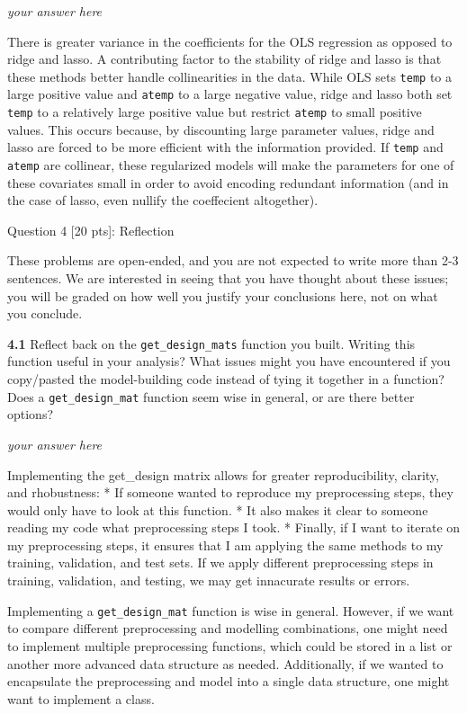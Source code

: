 \documentclass[11pt]{article}
\begin{document}
    \emph{your answer here}

There is greater variance in the coefficients for the OLS regression as
opposed to ridge and lasso. A contributing factor to the stability of
ridge and lasso is that these methods better handle collinearities in
the data. While OLS sets \texttt{temp} to a large positive value and
\texttt{atemp} to a large negative value, ridge and lasso both set
\texttt{temp} to a relatively large positive value but restrict
\texttt{atemp} to small positive values. This occurs because, by
discounting large parameter values, ridge and lasso are forced to be
more efficient with the information provided. If \texttt{temp} and
\texttt{atemp} are collinear, these regularized models will make the
parameters for one of these covariates small in order to avoid encoding
redundant information (and in the case of lasso, even nullify the
coeffecient altogether).

     Question 4 {[}20 pts{]}: Reflection

These problems are open-ended, and you are not expected to write more
than 2-3 sentences. We are interested in seeing that you have thought
about these issues; you will be graded on how well you justify your
conclusions here, not on what you conclude.

    \textbf{4.1} Reflect back on the \texttt{get\_design\_mats} function you
built. Writing this function useful in your analysis? What issues might
you have encountered if you copy/pasted the model-building code instead
of tying it together in a function? Does a \texttt{get\_design\_mat}
function seem wise in general, or are there better options?

    \emph{your answer here}

Implementing the get\_design matrix allows for greater reproducibility,
clarity, and rhobustness: * If someone wanted to reproduce my
preprocessing steps, they would only have to look at this function. * It
also makes it clear to someone reading my code what preprocessing steps
I took. * Finally, if I want to iterate on my preprocessing steps, it
ensures that I am applying the same methods to my training, validation,
and test sets. If we apply different preprocessing steps in training,
validation, and testing, we may get innacurate results or errors.

Implementing a \texttt{get\_design\_mat} function is wise in general.
However, if we want to compare different preprocessing and modelling
combinations, one might need to implement multiple preprocessing
functions, which could be stored in a list or another more advanced data
structure as needed. Additionally, if we wanted to encapsulate the
preprocessing and model into a single data structure, one might want to
implement a class.
\end{document}
